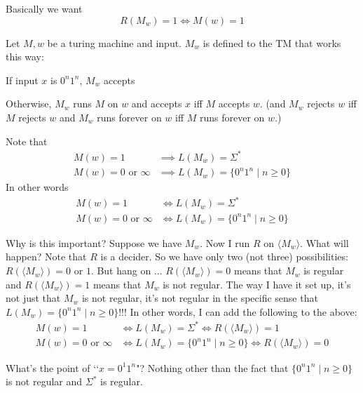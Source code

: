 Basically we want
\[
R(M_w) = 1 \iff M(w) = 1
\]

Let $M,w$ be a turing machine and input.
$M_w$ is defined to the TM that works this way:
\begin{tightlist}
\item If input $x$ is $0^n1^n$, $M_w$ accepts
\item Otherwise, $M_w$ runs $M$ on $w$ and accepts $x$ iff $M$ accepts $w$.
  (and
  $M_w$ rejects $w$ iff $M$ rejects $w$ and
  $M_w$ runs forever on $w$ iff $M$ runs forever on $w$.) 
\end{tightlist}
Note that
\begin{align*}
M(w) = 1 &\implies L(M_w) = \Sigma^* \\
M(w) = 0 \text{ or } \infty &\implies L(M_w) = \{ 0^n1^n \mid n \geq 0 \}
\end{align*}
In other words
\begin{align*}
M(w) = 1 &\iff L(M_w) = \Sigma^* \\
M(w) = 0 \text{ or } \infty &\iff L(M_w) = \{ 0^n1^n \mid n \geq 0 \}
\end{align*}

Why is this important?
Suppose we have $M_w$.
Now I run $R$ on $\langle M_w \rangle$.
What will happen?
Note that $R$ is a decider.
So we have only two (not three) possibilities:
$R(\langle M_w \rangle) = 0$ or $1$.
But hang on ...
$R(\langle M_w \rangle) = 0$ means that $M_w$ is regular and 
$R(\langle M_w \rangle) = 1$ means that $M_w$ is not regular.
The way I have it set up, it's not just that $M_w$ is not
regular, it's not regular in the specific sense that
$L(M_w) = \{0^n 1^n \mid n \geq 0\}$!!!
In other words,
I can add the following to the above:
\begin{align*}
M(w) = 1 &\iff L(M_w) = \Sigma^* \iff R(\langle M_w\rangle) = 1\\
M(w) = 0 \text{ or } \infty &\iff L(M_w) = \{ 0^n1^n \mid n \geq 0 \}
\iff R(\langle M_w\rangle) = 0
\end{align*}

What's the point of \lq\lq $x = 0^1 1^n$"?
Nothing other than the fact that $\{0^n 1^n \mid n \geq 0\}$
is not regular and $\Sigma^*$ is regular.

